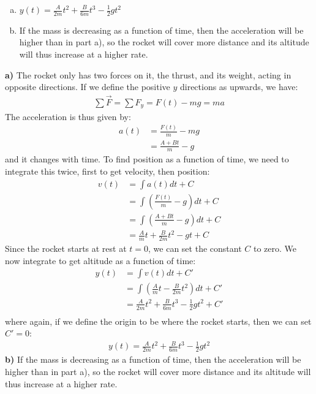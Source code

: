 \begin{finalanswer}
\begin{enumerate}[(a)]
\item $y(t) = \frac{A}{2m}t^2 + \frac{B}{6m}t^3 - \frac{1}{2}gt^2$
\item If the mass is decreasing as a function of time, then the acceleration will be higher than in part a), so the rocket will cover more distance and its altitude will thus increase at a higher rate.
\end{enumerate}
\end{finalanswer}
\begin{solution}
\textbf{a)} The rocket only has two forces on it, the thrust, and its weight, acting in opposite directions. If we define the positive $y$ directions as upwards, we have:
\begin{align*}
\sum \vec F = \sum F_y = F(t)-mg=ma
\end{align*}
The acceleration is thus given by:
\begin{align*}
a(t) &= \frac{F(t)}{m} - mg\\
&=\frac{A+Bt}{m}-g
\end{align*}
and it changes with time. To find position as a function of time, we need to integrate this twice, first to get velocity, then position:
\begin{align*}
v(t) &= \int a(t) dt +C\\
&=\int (\frac{F(t)}{m}-g) dt + C\\
&=\int (\frac{A+Bt}{m}-g) dt + C\\
&=  \frac{A}{m}t + \frac{B}{2m}t^2 - gt + C
\end{align*}
Since the rocket starts at rest at $t=0$, we can set the constant $C$ to zero. We now integrate to get altitude as a function of time:
\begin{align*}
y(t) &= \int v(t) dt + C'\\
&= \int \left( \frac{A}{m}t - \frac{B}{2m}t^2  \right) dt + C'\\
&= \frac{A}{2m}t^2 + \frac{B}{6m}t^3 - \frac{1}{2}gt^2+ C'\\  
\end{align*}
where again, if we define the origin to be where the rocket starts, then we can set $C'=0$:
\begin{align*}
y(t) = \frac{A}{2m}t^2 + \frac{B}{6m}t^3 - \frac{1}{2}gt^2
\end{align*} 
\textbf{b)} If the mass is decreasing as a function of time, then the acceleration will be higher than in part a), so the rocket will cover more distance and its altitude will thus increase at a higher rate.
\end{solution}

